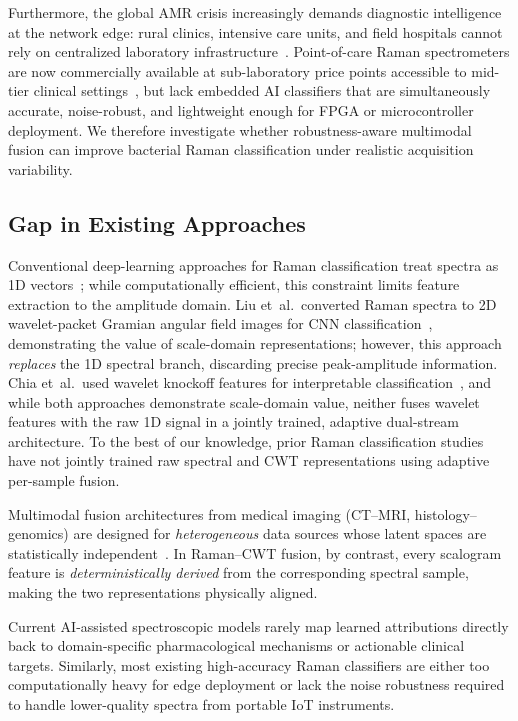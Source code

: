\documentclass[preprint,12pt]{elsarticle}
\begin{document}
Furthermore, the global AMR crisis increasingly demands diagnostic
intelligence at the network edge: rural clinics, intensive care units,
and field hospitals cannot rely on centralized laboratory
infrastructure~\cite{maruthamuthu2020rapid}. Point-of-care Raman
spectrometers are now commercially available at sub-laboratory price
points accessible to mid-tier clinical settings~\cite{ho2019rapid},
but lack embedded
AI classifiers that are simultaneously accurate, noise-robust, and
lightweight enough for FPGA or microcontroller deployment. We therefore investigate whether robustness-aware multimodal fusion can improve bacterial Raman classification under realistic acquisition variability.

\subsection{Gap in Existing Approaches}
\label{ssec:gap}

Conventional deep-learning approaches for Raman classification treat spectra as 1D vectors~\cite{ho2019rapid,zhou2022ramannet,
balytskyi2024open}; while computationally efficient, this constraint limits feature extraction to the amplitude domain. Liu et~al.\ converted Raman spectra to
2D wavelet-packet Gramian angular field images for CNN
classification~\cite{liu2024wpga}, demonstrating the value of
scale-domain representations; however, this approach \emph{replaces}
the 1D spectral branch, discarding precise peak-amplitude information.
Chia et~al.\ used wavelet knockoff features for interpretable
classification~\cite{chia2021interpretable}, and while both approaches
demonstrate scale-domain value, neither fuses wavelet features with the
raw 1D signal in a jointly trained, adaptive dual-stream architecture.
To the best of our knowledge, prior Raman classification studies have not jointly trained raw spectral and CWT representations using adaptive per-sample fusion.

Multimodal fusion architectures from medical imaging (CT--MRI,
histology--genomics) are designed for \emph{heterogeneous} data
sources whose latent spaces are statistically
independent~\cite{holzinger2022information}. In Raman--CWT fusion,
by contrast, every scalogram feature is \emph{deterministically
derived} from the corresponding spectral sample, making the two
representations physically aligned. 

Current AI-assisted spectroscopic models rarely map learned
attributions directly back to domain-specific pharmacological
mechanisms or actionable clinical targets. Similarly, most existing
high-accuracy Raman classifiers are either too computationally heavy
for edge deployment or lack the noise robustness required to handle
lower-quality spectra from portable IoT instruments. 
\end{document}
